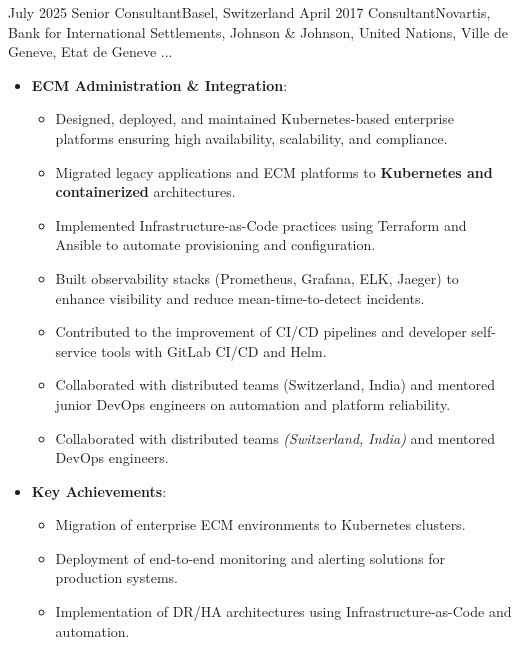 
\begin{experiences}

\consultantexperience
    {July 2025} {Senior Consultant}{}{Basel, Switzerland}
    {April 2017}    {Consultant}{Novartis, Bank for International Settlements, Johnson \& Johnson, United Nations, Ville de Geneve, Etat de Geneve ...} {
        \begin{itemize}[left=0pt,label={},itemsep=0.5em]

          \item \textbf{ECM Administration \& Integration}:
            \begin{itemize}[itemsep=0.2em,topsep=0.2em,parsep=0pt]
              \small
              \item Designed, deployed, and maintained Kubernetes-based enterprise platforms ensuring high availability, scalability, and compliance.
              \item Migrated legacy applications and ECM platforms to \textbf{Kubernetes and containerized} architectures.
              \item Implemented Infrastructure-as-Code practices using Terraform and Ansible to automate provisioning and configuration.
              \item Built observability stacks (Prometheus, Grafana, ELK, Jaeger) to enhance visibility and reduce mean-time-to-detect incidents.
              \item Contributed to the improvement of CI/CD pipelines and developer self-service tools with GitLab CI/CD and Helm.
              \item Collaborated with distributed teams (Switzerland, India) and mentored junior DevOps engineers on automation and platform reliability.
              \item Collaborated with distributed teams \emph{(Switzerland, India)} and mentored DevOps engineers.
            \end{itemize}

          \item \textbf{Key Achievements}:
            \begin{itemize}[itemsep=0.2em,topsep=0.2em,parsep=0pt]
              \small
              \item Migration of enterprise ECM environments to Kubernetes clusters.
              \item Deployment of end-to-end monitoring and alerting solutions for production systems.
              \item Implementation of DR/HA architectures using Infrastructure-as-Code and automation.
            \end{itemize}


\end{itemize}}
\end{experiences}
